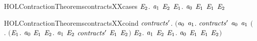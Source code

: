 \begin{SaveVerbatim}{HOLContractionTheoremscontractsXXcases}
       \HOLSymConst{\HOLTokenForall{}}\ensuremath{\HOLBoundVar{E}\sb{\mathrm{2}}}. \ensuremath{\HOLBoundVar{a}\sb{\mathrm{1}}} \HOLTokenTransBegin\HOLConst{\ensuremath{\tau}}\HOLTokenTransEnd \ensuremath{\HOLBoundVar{E}\sb{\mathrm{2}}} \HOLSymConst{\HOLTokenImp{}} \HOLSymConst{\HOLTokenExists{}}\ensuremath{\HOLBoundVar{E}\sb{\mathrm{1}}}.  \ensuremath{\HOLBoundVar{a}\sb{\mathrm{0}}} \ensuremath{\HOLBoundVar{E}\sb{\mathrm{1}}} \HOLSymConst{\HOLTokenConj{}}  \ensuremath{\HOLBoundVar{E}\sb{\mathrm{1}}} \ensuremath{\HOLBoundVar{E}\sb{\mathrm{2}}}
\end{SaveVerbatim}
\newcommand{\HOLContractionTheoremscontractsXXcases}{\UseVerbatim{HOLContractionTheoremscontractsXXcases}}
\begin{SaveVerbatim}{HOLContractionTheoremscontractsXXcoind}
\HOLTokenTurnstile{} \HOLSymConst{\HOLTokenForall{}}\ensuremath{\HOLBoundVar{contracts}\sp{\prime}}.
       \ensuremath{(}\HOLSymConst{\HOLTokenForall{}}\ensuremath{\HOLBoundVar{a}\sb{\mathrm{0}}} \ensuremath{\HOLBoundVar{a}\sb{\mathrm{1}}}.
            \ensuremath{\HOLBoundVar{contracts}\sp{\prime}} \ensuremath{\HOLBoundVar{a}\sb{\mathrm{0}}} \ensuremath{\HOLBoundVar{a}\sb{\mathrm{1}}} \HOLSymConst{\HOLTokenImp{}}
            \ensuremath{(}\HOLSymConst{\HOLTokenForall{}}.
                 \ensuremath{(}\HOLSymConst{\HOLTokenForall{}}\ensuremath{\HOLBoundVar{E}\sb{\mathrm{1}}}.
                      \ensuremath{\HOLBoundVar{a}\sb{\mathrm{0}}} \HOLTokenTransBegin{} \HOLTokenTransEnd \ensuremath{\HOLBoundVar{E}\sb{\mathrm{1}}} \HOLSymConst{\HOLTokenImp{}}
                      \HOLSymConst{\HOLTokenExists{}}\ensuremath{\HOLBoundVar{E}\sb{\mathrm{2}}}. \ensuremath{\HOLBoundVar{a}\sb{\mathrm{1}}} \HOLTokenTransBegin{} \HOLTokenTransEnd \ensuremath{\HOLBoundVar{E}\sb{\mathrm{2}}} \HOLSymConst{\HOLTokenConj{}} \ensuremath{\HOLBoundVar{contracts}\sp{\prime}} \ensuremath{\HOLBoundVar{E}\sb{\mathrm{1}}} \ensuremath{\HOLBoundVar{E}\sb{\mathrm{2}}}\ensuremath{)} \HOLSymConst{\HOLTokenConj{}}
                 \HOLSymConst{\HOLTokenForall{}}\ensuremath{\HOLBoundVar{E}\sb{\mathrm{2}}}.
                     \ensuremath{\HOLBoundVar{a}\sb{\mathrm{1}}} \HOLTokenTransBegin{} \HOLTokenTransEnd \ensuremath{\HOLBoundVar{E}\sb{\mathrm{2}}} \HOLSymConst{\HOLTokenImp{}}
                     \HOLSymConst{\HOLTokenExists{}}\ensuremath{\HOLBoundVar{E}\sb{\mathrm{1}}}. \ensuremath{\HOLBoundVar{a}\sb{\mathrm{0}}} \HOLTokenWeakTransBegin{} \HOLTokenWeakTransEnd \ensuremath{\HOLBoundVar{E}\sb{\mathrm{1}}} \HOLSymConst{\HOLTokenConj{}}  \ensuremath{\HOLBoundVar{E}\sb{\mathrm{1}}} \ensuremath{\HOLBoundVar{E}\sb{\mathrm{2}}}\ensuremath{)} \HOLSymConst{\HOLTokenConj{}}

\end{SaveVerbatim}
